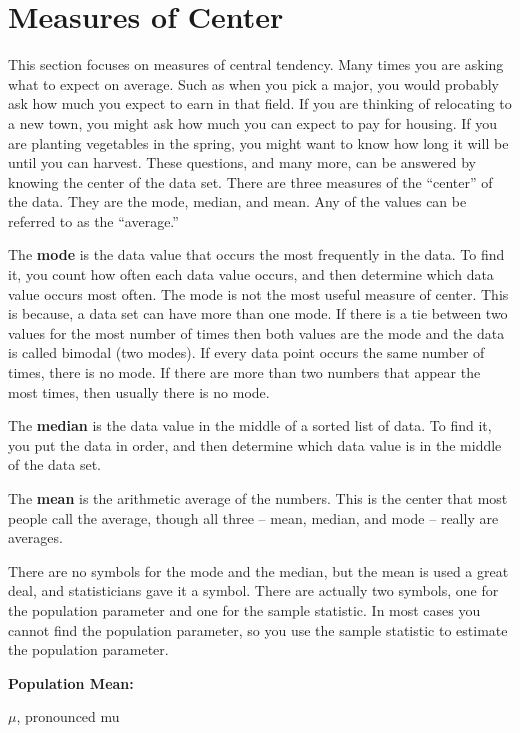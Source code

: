 \documentclass[]{book}
\begin{document}
\hypertarget{measures-of-center}{%
\section{Measures of Center}\label{measures-of-center}}

This section focuses on measures of central tendency. Many times you are asking what to expect on average. Such as when you pick a major, you would probably ask how much you expect to earn in that field. If you are thinking of relocating to a new town, you might ask how much you can expect to pay for housing. If you are planting vegetables in the spring, you might want to know how long it will be until you can harvest. These questions, and many more, can be answered by knowing the center of the data set. There are three measures of the ``center'' of the data. They are the mode, median, and mean. Any of the values can be referred to as the ``average.''

The \textbf{mode} is the data value that occurs the most frequently in the data. To find it, you count how often each data value occurs, and then determine which data value occurs most often. The mode is not the most useful measure of center. This is because, a data set can have more than one mode. If there is a tie between two values for the most number of times then both values are the mode and the data is called bimodal (two modes). If every data point occurs the same number of times, there is no mode. If there are more than two numbers that appear the most times, then usually there is no mode.

The \textbf{median} is the data value in the middle of a sorted list of data. To find it, you put the data in order, and then determine which data value is in the middle of the data set.

The \textbf{mean} is the arithmetic average of the numbers. This is the center that most people call the average, though all three -- mean, median, and mode -- really are averages.

There are no symbols for the mode and the median, but the mean is used a great deal, and statisticians gave it a symbol. There are actually two symbols, one for the population parameter and one for the sample statistic. In most cases you cannot find the population parameter, so you use the sample statistic to estimate the population parameter.

\textbf{Population Mean:}

\(\mu\), pronounced mu
\end{document}
